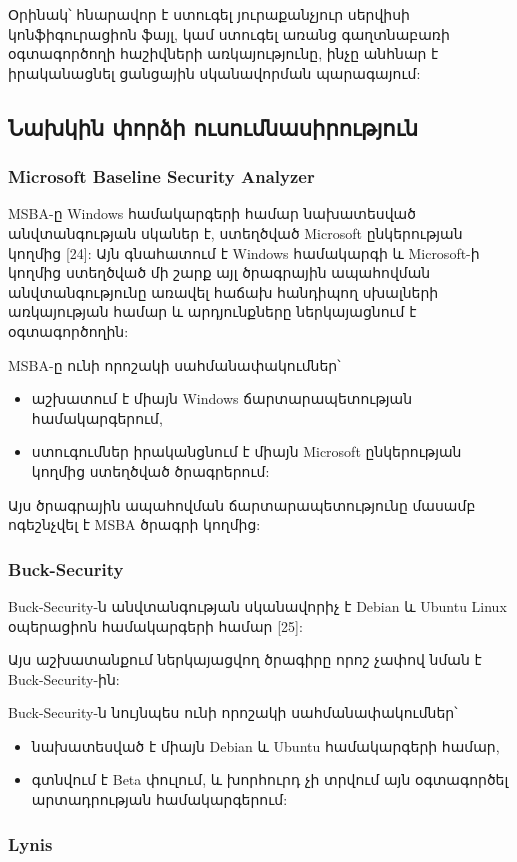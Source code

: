 \documentclass[a4paper,12pt]{article}
\begin{document}
\begin{sloppypar}
Օրինակ՝ հնարավոր է ստուգել յուրաքանչյուր սերվիսի կոնֆիգուրացիոն ֆայլ,
կամ ստուգել առանց գաղտնաբառի օգտագործողի հաշիվների առկայությունը,
ինչը անհնար է իրականացնել ցանցային սկանավորման պարագայում:


\subsection{Նախկին փորձի ուսումնասիրություն}


\subsubsection{Microsoft Baseline Security Analyzer}


MSBA-ը Windows համակարգերի համար նախատեսված անվտանգության սկաներ է,
ստեղծված Microsoft ընկերության կողմից [24]: Այն գնահատում է Windows
համակարգի և Microsoft-ի կողմից ստեղծված մի շարք այլ ծրագրային ապահովման
անվտանգությունը առավել հաճախ հանդիպող սխալների առկայության համար և արդյունքները 
ներկայացնում է օգտագործողին:

MSBA-ը ունի որոշակի սահմանափակումներ՝
\begin{itemize}
\item աշխատում է միայն Windows ճարտարապետության համակարգերում,
\item ստուգումներ իրականցնում է միայն Microsoft ընկերության
	կողմից ստեղծված ծրագրերում:
\end{itemize}

Այս ծրագրային ապահովման ճարտարապետությունը մասամբ ոգեշնչվել է
MSBA ծրագրի կողմից:


\subsubsection{Buck-Security}


Buck-Security-ն անվտանգության սկանավորիչ է Debian և Ubuntu Linux
օպերացիոն համակարգերի համար [25]:

Այս աշխատանքում ներկայացվող ծրագիրը որոշ չափով նման է Buck-Security-ին:

Buck-Security-ն նույնպես ունի որոշակի սահմանափակումներ՝
\begin{itemize}
\item նախատեսված է միայն Debian և Ubuntu համակարգերի համար,
\item գտնվում է Beta փուլում, և խորհուրդ չի տրվում այն օգտագործել
	արտադրության համակարգերում:
\end{itemize}


\subsubsection{Lynis}



\end{sloppypar}
\end{document}
